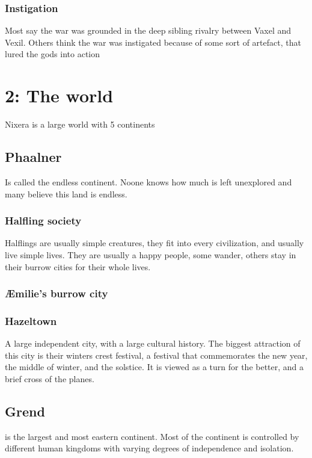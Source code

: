 \documentclass[a4paper]{article}
\begin{document}
\subsubsection{Instigation}
Most say the war was grounded in the deep sibling rivalry between Vaxel and Vexil. Others think the war was instigated because of some sort of artefact, that lured the gods into action 
\section{2: The world}
Nixera is a large world with 5 continents
\subsection{Phaalner}
Is called the endless continent. Noone knows how much is left unexplored and many believe this land is endless.

\subsubsection{Halfling society}
Halflings are usually simple creatures, they fit into every civilization, and usually live simple lives. They are usually a happy people, some wander, others stay in their burrow cities for their whole lives. 

\subsubsection{Æmilie's burrow city}

\subsubsection{Hazeltown}
A large independent city, with a large cultural history. The biggest attraction of this city is their winters crest festival, a festival that commemorates the new year, the middle of winter, and the solstice. It is viewed as a turn for the better, and a brief cross of the planes.

\subsection{Grend}
is the largest and most eastern continent. Most of the continent is controlled by different human kingdoms with varying degrees of independence and isolation.
\end{document}
